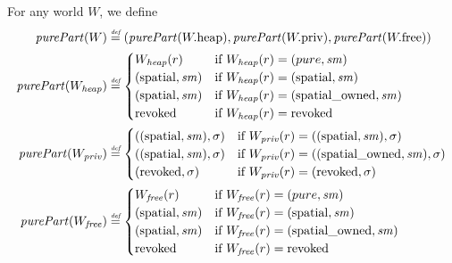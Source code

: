 \documentclass[a4paper]{article}
\begin{document}
\begin{definition}
  For any world $W$, we define
  \begin{align*}
    \purePart{W} &\defeq (\purePart{\pwheap},\purePart{\pwpriv},\purePart{\pwfree})\\
    \purePart{W_\var{heap}} &\defeq
                       \begin{cases}
                         W_{\var{heap}}(r) & \text{if } W_\var{heap}(r) = (pure,\var{sm})\\
                         (\spatial,\var{sm}) & \text{if } W_\var{heap}(r) = (\spatial,\var{sm})\\
                         (\spatial,\var{sm}) & \text{if } W_\var{heap}(r) = (\spatialo,\var{sm})\\
                         \revoked & \text{if } W_\var{heap}(r) = \revoked\\
                       \end{cases}\\
    \purePart{W_\var{priv}} &\defeq
                       \begin{cases}
                         ((\spatial,\var{sm}),\sigma) & \text{if } W_\var{priv}(r) = ((\spatial,\var{sm}),\sigma)\\
                         ((\spatial,\var{sm}),\sigma) & \text{if } W_\var{priv}(r) = ((\spatialo,\var{sm}),\sigma)\\
                         (\revoked,\sigma) & \text{if } W_\var{priv}(r) = (\revoked,\sigma)\\
                       \end{cases}\\
    \purePart{W_\var{free}} &\defeq
                       \begin{cases}
                         W_{\var{free}}(r) & \text{if } W_{\var{free}}(r) = (pure,\var{sm})\\
                         (\spatial,\var{sm}) & \text{if } W_{\var{free}}(r) = (\spatial,\var{sm})\\
                         (\spatial,\var{sm}) & \text{if } W_{\var{free}}(r) = (\spatialo,\var{sm})\\
                         \revoked & \text{if } W_{\var{free}}(r) = \revoked\\
                       \end{cases}
  \end{align*}
\end{definition}
\end{document}
